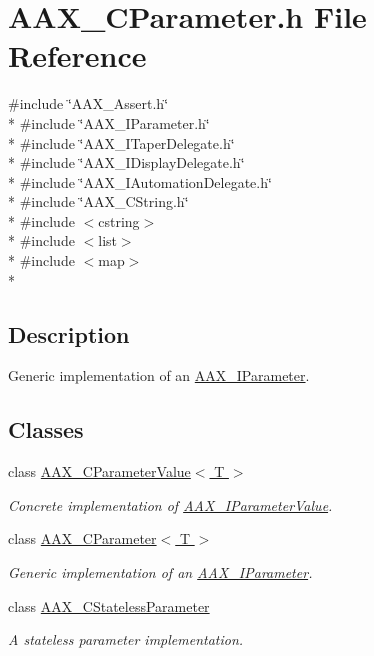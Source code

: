 \hypertarget{a00190}{}\section{A\+A\+X\+\_\+\+C\+Parameter.\+h File Reference}
\label{a00190}
{\ttfamily \#include \char`\"{}A\+A\+X\+\_\+\+Assert.\+h\char`\"{}}\\*
{\ttfamily \#include \char`\"{}A\+A\+X\+\_\+\+I\+Parameter.\+h\char`\"{}}\\*
{\ttfamily \#include \char`\"{}A\+A\+X\+\_\+\+I\+Taper\+Delegate.\+h\char`\"{}}\\*
{\ttfamily \#include \char`\"{}A\+A\+X\+\_\+\+I\+Display\+Delegate.\+h\char`\"{}}\\*
{\ttfamily \#include \char`\"{}A\+A\+X\+\_\+\+I\+Automation\+Delegate.\+h\char`\"{}}\\*
{\ttfamily \#include \char`\"{}A\+A\+X\+\_\+\+C\+String.\+h\char`\"{}}\\*
{\ttfamily \#include $<$cstring$>$}\\*
{\ttfamily \#include $<$list$>$}\\*
{\ttfamily \#include $<$map$>$}\\*


\subsection{Description}
Generic implementation of an \hyperlink{a00108}{A\+A\+X\+\_\+\+I\+Parameter}. 

\subsection*{Classes}
\begin{DoxyCompactItemize}
\item 
class \hyperlink{a00035}{A\+A\+X\+\_\+\+C\+Parameter\+Value$<$ T $>$}
\begin{DoxyCompactList}\small\item\em Concrete implementation of \hyperlink{a00109}{A\+A\+X\+\_\+\+I\+Parameter\+Value}. \end{DoxyCompactList}\item 
class \hyperlink{a00033}{A\+A\+X\+\_\+\+C\+Parameter$<$ T $>$}
\begin{DoxyCompactList}\small\item\em Generic implementation of an \hyperlink{a00108}{A\+A\+X\+\_\+\+I\+Parameter}. \end{DoxyCompactList}\item 
class \hyperlink{a00040}{A\+A\+X\+\_\+\+C\+Stateless\+Parameter}
\begin{DoxyCompactList}\small\item\em A stateless parameter implementation. \end{DoxyCompactList}\end{DoxyCompactItemize}
